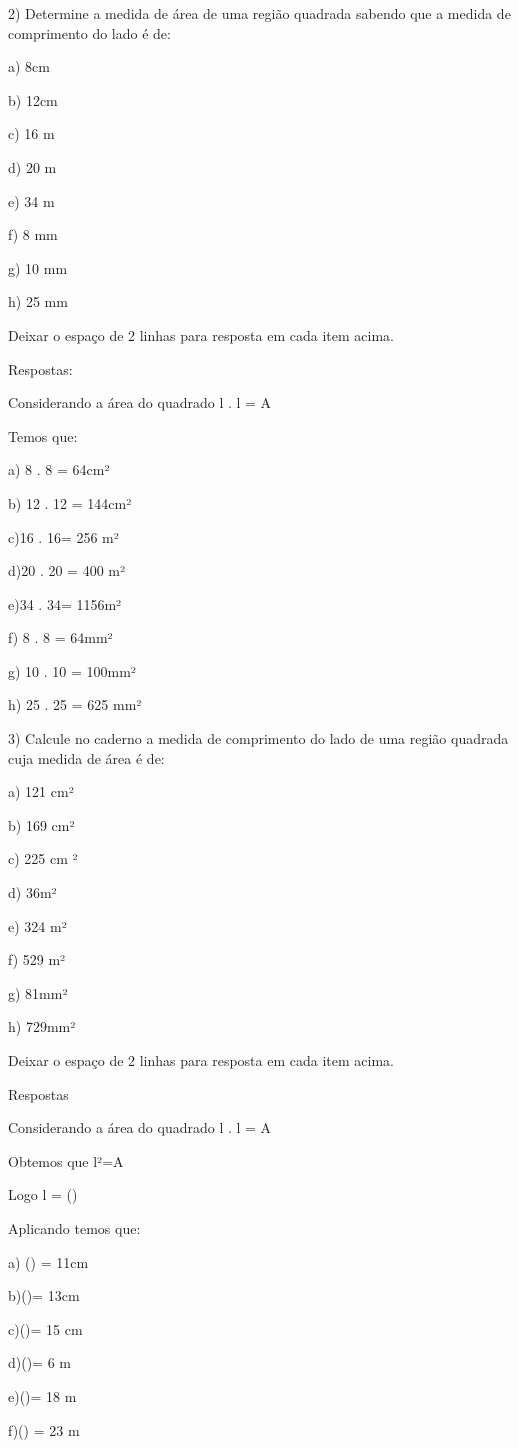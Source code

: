 2) Determine a medida de área de uma região quadrada sabendo que a
medida de comprimento do lado é de:

a) 8cm

b) 12cm

c) 16 m

d) 20 m

e) 34 m

f) 8 mm

g) 10 mm

h) 25 mm

Deixar o espaço de 2 linhas para resposta em cada item acima.

Respostas:

Considerando a área do quadrado l . l = A

Temos que:

a) 8 . 8 = 64cm²

b) 12 . 12 = 144cm²

c)16 . 16= 256 m²

d)20 . 20 = 400 m²

e)34 . 34= 1156m²

f) 8 . 8 = 64mm²

g) 10 . 10 = 100mm²

h) 25 . 25 = 625 mm²

3) Calcule no caderno a medida de comprimento do lado de uma região
quadrada cuja medida de área é de:

a) 121 cm²

b) 169 cm²

c) 225 cm ²

d) 36m²

e) 324 m²

f) 529 m²

g) 81mm²

h) 729mm²

Deixar o espaço de 2 linhas para resposta em cada item acima.

Respostas

Considerando a área do quadrado l . l = A

Obtemos que l²=A

Logo l = ()

Aplicando temos que:

a) () = 11cm

b)()= 13cm

c)()= 15 cm

d)()= 6 m

e)()= 18 m

f)() = 23 m

